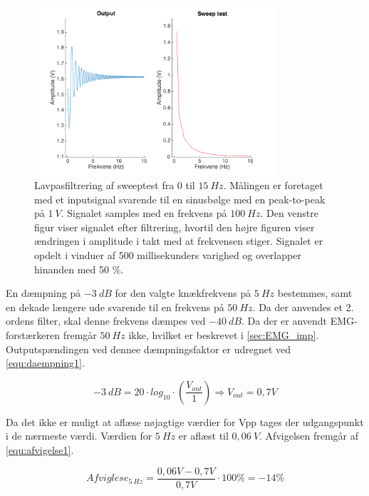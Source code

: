 \begin{figure}[H]
\centering
\includegraphics[width=0.8\textwidth]{figures/Lavpass_test}
\caption{Lavpasfiltrering af sweeptest fra 0 til $15~Hz$. Målingen er foretaget med et inputsignal svarende til en sinusbølge med en peak-to-peak på $1~V$. Signalet samples med en frekvens på $100~Hz$. Den venstre figur viser signalet efter filtrering, hvortil den højre figuren viser ændringen i amplitude i takt med at frekvensen stiger. Signalet er opdelt i vinduer af 500 millisekunders varighed og overlapper hinanden med 50 \%.}
\label{fig:lavps_sweep}
\end{figure}

\noindent
En dæmpning på $-3~dB$ for den valgte knækfrekvens på $5~Hz$ bestemmes, samt en dekade længere ude svarende til en frekvens på $50~Hz$. Da der anvendes et 2. ordens filter, skal denne frekvens dæmpes ved $-40~dB$. Da der er anvendt EMG-forstærkeren fremgår $50~Hz$ ikke, hvilket er beskrevet i \autoref{sec:EMG_imp}. Outputspændingen ved dennee dæmpningsfaktor er udregnet ved \autoref{equ:daempning1}. 

\begin{equation} \label{equ:daempning1}
-3~dB = 20 \cdot log_{10} \cdot (\frac{V_{out}}{1}) \Rightarrow V_{out} = 0,7 V
\end{equation}

\noindent
Da det ikke er muligt at aflæse nøjagtige værdier for Vpp tages der udgangspunkt i de nærmeste værdi. Værdien for $5~Hz$ er  aflæst til $0,06~V$. Afvigelsen fremgår af \autoref{equ:afvigelse1}.

\begin{equation} \label{equ:afvigelse1}
Afviglese_{5~Hz} = \frac{0,06V-0,7V}{0,7V} \cdot 100\%  = - 14 \%
\end{equation}


